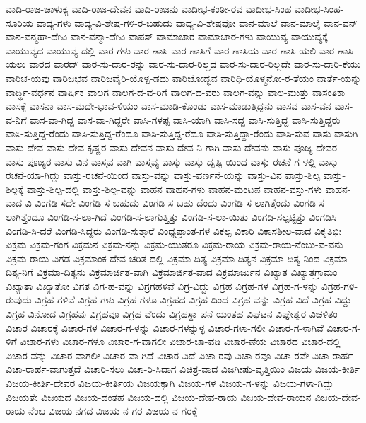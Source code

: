 ವಾದಿ-ರಾಜ-ಚಾಳುಕ್ಯ
ವಾದಿ-ರಾಜ-ದೇವನ
ವಾದಿ-ರಾಜನು
ವಾದೀಭ-ಕಂಠೀ-ರವ
ವಾದೀಭ-ಸಿಂಹ
ವಾದೀಭ-ಸಿಂಹ-ಸೂರಿಯ
ವಾದ್ಯ-ಗಳು
ವಾದ್ಯ-ವಿ-ಶೇಷ-ಗಳಿ-ರ-ಬಹುದು
ವಾದ್ಯ-ವಿ-ಶೇಷವೋ
ವಾನ-ಮಾಲೆ
ವಾನ-ಮಾಲೈ
ವಾನ-ವನ್
ವಾನ-ವನ್ಮಹಾ-ದೇವಿ
ವಾನ-ವನ್ಮಾ-ದೇವಿ
ವಾಪಸ್
ವಾಮಾಚಾರ
ವಾಮಾಚಾರ-ಗಳು
ವಾಯುವ್ಯ
ವಾಯುವ್ಯಕ್ಕೆ
ವಾಯುವ್ಯದ
ವಾಯುವ್ಯ-ದಲ್ಲಿ
ವಾರ-ಗಳು
ವಾರ-ಣಾಸಿ
ವಾರ-ಣಾಸಿಗೆ
ವಾರ-ಣಾಸಿಯ
ವಾರ-ಣಾಸಿ-ಯಲಿ
ವಾರ-ಣಾಸಿ-ಯಲು
ವಾರದ
ವಾರದ್
ವಾರ-ಸು-ದಾರ-ರನ್ನು
ವಾರ-ಸು-ದಾರ-ರಿಲ್ಲದ
ವಾರ-ಸು-ದಾರ-ರಿಲ್ಲದೇ
ವಾರ-ಸು-ದಾರಿ-ಕೆಯು
ವಾರಿಚ-ಯವು
ವಾರಿಜಭವ
ವಾರಿಜವೈರಿ-ಯೊಳ್ಪ-ಡದು
ವಾರಿಜೋದ್ಭವ
ವಾರಿಧಿ-ಯೊಳ್ಮನೋ-ರ-ತೆಯಂ
ವಾರ್ತೆ-ಯನ್ನು
ವಾರ್ದ್ಧಿ-ವರ್ಧನ
ವಾರ್ಷಿಕ
ವಾಲಗ
ವಾಲಗ-ದ-ವ-ರಿಗೆ
ವಾಲಗ-ದ-ವರು
ವಾಲಗ-ವನ್ನು
ವಾಲ-ಮುತ್ತು
ವಾಸಂತಿಕಾ
ವಾಸಕ್ಕೆ
ವಾಸನಾ
ವಾಸ-ಮದೇ-ಭಾವ-ಳಿಯಂ
ವಾಸ-ಮಾಡಿ-ಕೊಂಡು
ವಾಸ-ಮಾಡುತ್ತಿದ್ದನು
ವಾಸವ
ವಾಸ-ವನ
ವಾಸ-ವ-ನಿಗೆ
ವಾಸ-ವಾ-ಗಿದ್ದ
ವಾಸ-ವಾ-ಗಿದ್ದರೇ
ವಾಸಿ-ಗಳಪ್ಪ
ವಾಸಿ-ಯಾಗಿ
ವಾಸಿ-ಸದ್ದ
ವಾಸಿ-ಸುತ್ತಿದ್ದ
ವಾಸಿ-ಸುತ್ತಿದ್ದರು
ವಾಸಿ-ಸುತ್ತಿದ್ದ-ರೆಂದು
ವಾಸಿ-ಸುತ್ತಿದ್ದ-ರೆಂದೂ
ವಾಸಿ-ಸುತ್ತಿದ್ದ-ರೆದೂ
ವಾಸಿ-ಸುತ್ತಿದ್ದಾ-ರೆಂದು
ವಾಸಿ-ಸುವ
ವಾಸು
ವಾಸುಗಿ
ವಾಸು-ದೇವ
ವಾಸು-ದೇವ-ಕೃಷ್ಣರ
ವಾಸು-ದೇವನ
ವಾಸು-ದೇವ-ನಿ-ಗಾಗಿ
ವಾಸು-ದೇವನು
ವಾಸು-ಪೂಜ್ಯ-ದೇವರ
ವಾಸು-ಪೂಜ್ಯರ
ವಾಸು-ವಿನ
ವಾಸ್ತವ-ವಾಗಿ
ವಾಸ್ತವ್ಯ
ವಾಸ್ತು
ವಾಸ್ತು-ದೃಷ್ಟಿ-ಯಿಂದ
ವಾಸ್ತು-ರಚನೆ-ಗ-ಳಲ್ಲಿ
ವಾಸ್ತು-ರಚನೆ-ಯಾ-ಗಿದ್ದು
ವಾಸ್ತು-ರಚನೆ-ಯಿಂದ
ವಾಸ್ತು-ವನ್ನು
ವಾಸ್ತು-ವರ್ಣನೆ-ಯನ್ನು
ವಾಸ್ತು-ವಿನ
ವಾಸ್ತು-ಶಿಲ್ಪ
ವಾಸ್ತು-ಶಿಲ್ಪಕ್ಕೆ
ವಾಸ್ತು-ಶಿಲ್ಪ-ದಲ್ಲಿ
ವಾಸ್ತು-ಶಿಲ್ಪ-ವನ್ನು
ವಾಹನ
ವಾಹನ-ಗಳು
ವಾಹನ-ಮಂಟಪ
ವಾಹನ-ವಸ್ತು-ಗಳು
ವಾಹನ-ವಾದ
ವಿ
ವಿಂಗಡಿ-ಸದೇ
ವಿಂಗಡಿ-ಸ-ಬಹುದು
ವಿಂಗಡಿ-ಸ-ಬಹು-ದೆಂದು
ವಿಂಗಡಿ-ಸ-ಲಾಗಿತ್ತೆಂದು
ವಿಂಗಡಿ-ಸ-ಲಾಗಿತ್ತೆಂದೂ
ವಿಂಗಡಿ-ಸ-ಲಾ-ಗಿದೆ
ವಿಂಗಡಿ-ಸ-ಲಾಗುತ್ತಿತ್ತು
ವಿಂಗಡಿ-ಸ-ಲಾ-ಯಿತು
ವಿಂಗಡಿ-ಸಲ್ಪಟ್ಟಿತ್ತು
ವಿಂಗಡಿಸಿ
ವಿಂಗಡಿ-ಸಿ-ದರೆ
ವಿಂಗಡಿ-ಸಿದ್ದರು
ವಿಂಗಡಿ-ಸುತ್ತಾರೆ
ವಿಂಧ್ಯಪ್ರಾಂತ-ಗಳ
ವಿಕಲ್ಪ
ವಿಕಾರಿ
ವಿಕಾಸಶೀಲ-ವಾದ
ವಿಕೃತಿಭಿಃ
ವಿಕ್ರಮ
ವಿಕ್ರಮ-ಗಂಗ
ವಿಕ್ರಮನ
ವಿಕ್ರಮ-ನನ್ನು
ವಿಕ್ರಮ-ಯುತರೂ
ವಿಕ್ರಮ-ರಾಯ
ವಿಕ್ರಮ-ರಾಯ-ನೆಂಬು-ವ-ವನು
ವಿಕ್ರಮ-ರಾಯ-ವಿಗಡ
ವಿಕ್ರಮಾಂಕ-ದೇವ-ಚರಿತ-ದಲ್ಲಿ
ವಿಕ್ರಮಾ-ದಿತ್ಯ
ವಿಕ್ರಮಾ-ದಿತ್ಯನ
ವಿಕ್ರಮಾ-ದಿತ್ಯ-ನಿಂದ
ವಿಕ್ರಮಾ-ದಿತ್ಯ-ನಿಗೆ
ವಿಕ್ರಮಾ-ದಿತ್ಯನು
ವಿಕ್ರಮಾರ್ಜಿತ-ವಾಗಿ
ವಿಕ್ರಮಾರ್ಜಿತ-ವಾದ
ವಿಕ್ರಮಾರ್ಜುನ
ವಿಖ್ಯಾತ
ವಿಖ್ಯಾತಗ್ರಾಮಂ
ವಿಖ್ಯಾತಾ
ವಿಖ್ಯಾತೋ
ವಿಗತ
ವಿಗ-ಹ-ವನ್ನು
ವಿಗ್ರಗಹಳಿವೆ
ವಿಗ್ರ-ವಿದ್ದು
ವಿಗ್ರಹ
ವಿಗ್ರಹ-ಗಳ
ವಿಗ್ರಹ-ಗ-ಳನ್ನು
ವಿಗ್ರಹ-ಗಳಿ-ರುವುದು
ವಿಗ್ರಹ-ಗಳಿವೆ
ವಿಗ್ರಹ-ಗಳು
ವಿಗ್ರಹ-ಗಳೂ
ವಿಗ್ರಹದ
ವಿಗ್ರಹ-ದಿಂದ
ವಿಗ್ರಹ-ವನ್ನು
ವಿಗ್ರಹ-ವಿದೆ
ವಿಗ್ರಹ-ವಿದ್ದು
ವಿಗ್ರಹ-ವಿನೋದ
ವಿಗ್ರಹವು
ವಿಗ್ರಹವೂ
ವಿಗ್ರಹ-ವೆಂದು
ವಿಗ್ರಹಸ್ಥಾ-ಪನೆ-ಯಂತಹ
ವಿಘಟನ
ವಿಘ್ನೇಶ್ವರ
ವಿಚಳಿತಂ
ವಿಚಾರ
ವಿಚಾರಕ್ಕೆ
ವಿಚಾರ-ಗಳ
ವಿಚಾರ-ಗ-ಳನ್ನು
ವಿಚಾರ-ಗಳನ್ನುಳ್ಳ
ವಿಚಾರ-ಗಳಾ-ಗಲೀ
ವಿಚಾರ-ಗ-ಳಾಗಿವೆ
ವಿಚಾರ-ಗ-ಳಿಗೆ
ವಿಚಾರ-ಗಳು
ವಿಚಾರ-ಗಳೂ
ವಿಚಾರ-ಗ-ವಾಗಲೀ
ವಿಚಾರ-ಚಾ-ವಡಿ
ವಿಚಾರ-ಣೆಯ
ವಿಚಾರದ
ವಿಚಾರ-ದಲ್ಲಿ
ವಿಚಾರ-ವನ್ನು
ವಿಚಾರ-ವಾಗಲೀ
ವಿಚಾರ-ವಾ-ಗಿದೆ
ವಿಚಾರ-ವಿದೆ
ವಿಚಾ-ರವು
ವಿಚಾ-ರವೂ
ವಿಚಾ-ರವೇ
ವಿಚಾ-ರಾರ್ಹ
ವಿಚಾ-ರಾರ್ಹ-ವಾಗುತ್ತದೆ
ವಿಚಾರಿ-ಸಲು
ವಿಚಾ-ರಿ-ಸಿದಾಗ
ವಿಚಿತ್ರ-ವಾದ
ವಿಜಗೀಷು-ವೃತ್ತಿಯಿಂ
ವಿಜಯ
ವಿಜಯ-ಕೀರ್ತಿ
ವಿಜಯ-ಕೀರ್ತಿ-ದೇವರ
ವಿಜಯ-ಕೀರ್ತಿಯ
ವಿಜಯಕ್ಕಾಗಿ
ವಿಜಯ-ಗಳ
ವಿಜಯ-ಗ-ಳನ್ನು
ವಿಜಯ-ಗಳಾ-ಗಿದ್ದು
ವಿಜಯತೇ
ವಿಜಯದ
ವಿಜಯ-ದಂತಹ
ವಿಜಯ-ದಲ್ಲಿ
ವಿಜಯ-ದೇವ-ರಾಯ
ವಿಜಯ-ದೇವ-ರಾಯನ
ವಿಜಯ-ದೇವ-ರಾಯ-ನೆಂಬ
ವಿಜಯ-ನಗದ
ವಿಜಯ-ನ-ಗರ
ವಿಜಯ-ನ-ಗರಕ್ಕೆ
